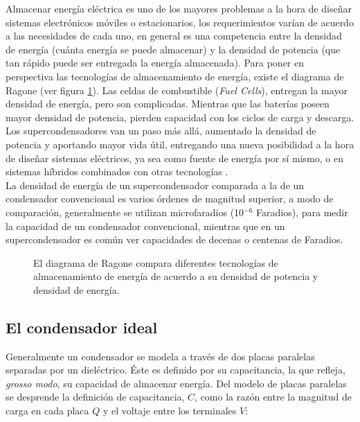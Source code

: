 Almacenar energía eléctrica es uno de los mayores problemas a la hora de diseñar sistemas electrónicos móviles o estacionarios, los requerimientos varían de acuerdo a las necesidades de cada uno, en general es una competencia entre la densidad de energía (cuánta energía se puede almacenar) y la densidad de potencia (que tan rápido puede ser entregada la energía almacenada). Para poner en perspectiva las tecnologías de almacenamiento de energía, existe el diagrama de Ragone (ver figura \ref{fig:ragone}). Las celdas de combustible (\textit{Fuel Cells}), entregan la mayor densidad de energía, pero son complicadas. Mientras que las baterías poseen mayor densidad de potencia, pierden capacidad con los ciclos de carga y descarga. Los supercondensadores van un paso más allá, aumentado la densidad de potencia y aportando mayor vida útil, entregando una nueva posibilidad a la hora de diseñar sistemas eléctricos, ya sea como fuente de energía por sí mismo, o en sistemas híbridos combinados con otras tecnologías \citep{Thounthong2009}.\\
La densidad de energía de un supercondensador comparada a la de un condensador convencional es varios órdenes de magnitud superior, a modo de comparación, generalmente se utilizan microfaradios (10$^{-6}$ Faradios), para medir la capacidad de un condensador convencional, mientras que en un supercondensador es común ver capacidades de decenas o centenas de Faradios.


\begin{figure}
	\centering
	\caption[Diagrama de Ragone]{El diagrama de Ragone compara diferentes tecnologías de almacenamiento de energía de acuerdo a su densidad de potencia y densidad de energía.}
	\label{fig:ragone}
\end{figure}

\subsection{El condensador ideal}
Generalmente un condensador se modela a través de dos placas paralelas separadas por un dieléctrico. Éste es definido por su capacitancia, la que refleja, \emph{grosso modo}, su capacidad de almacenar energía. Del modelo de placas paralelas se desprende la definición de capacitancia, $C$, como la razón entre la magnitud de carga en cada placa $Q$ y el voltaje entre los terminales $V$:

